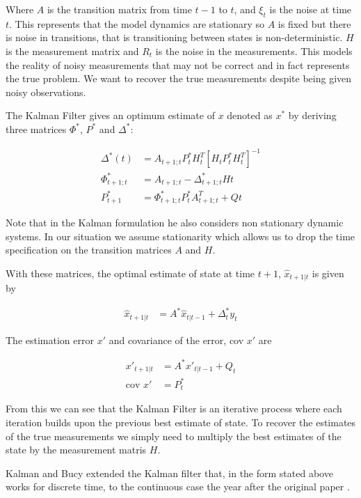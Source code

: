 \documentclass[]{../resources/final_report}
\begin{document}
Where $A$ is the transition matrix from time $t-1$ to $t$, and $\xi_t$ is the noise at time $t$. This represents that the model dynamics are stationary so $A$ is fixed but there is noise in transitions, that is transitioning between states is non-deterministic. $H$ is the measurement matrix and $R_t$ is the noise in the measurements. This models the reality of noisy measurements that may not be correct and in fact represents the true problem. We want to recover the true measurements despite being given noisy observations.
 
The Kalman Filter gives an optimum estimate of $x$ denoted as $x^*$ by deriving three matrices 
$\Phi^*$, $P^*$ and $\Delta^*$:

\begin{align}
  \Delta^*(t) &= A_{t+1;t}P^*_tH^T_t[H_tP^*_tH^T_t]^{-1} \\
  \Phi^*_{t+1;t} &= A_{t+1;t} - \Delta^*_{t+1;t}H{t} \\
  P^*_{t+1} &= \Phi^*_{t+1;t}P^*_tA^T_{t+1;t} + Q{t}
\end{align}

\pagebreak
Note that in the Kalman formulation he also considers non stationary dynamic systems. In our situation we assume stationarity which allows us to drop the time specification on the transition matrices $A$ and $H$.

With these matrices, the optimal estimate of state at time $t+1$, $\hat{x}_{t+1|t}$ is given by 

\begin{align}
  \hat{x}_{t+1|t} &= A^*\hat{x}_{t|t-1} + \Delta^*_ty_t
\end{align}

The estimation error $x'$ and covariance of the error, cov $x'$ are

\begin{align}
  x'_{t+1|t} &= A^*x'_{t|t-1} + Q_t \\
  \text{cov } x' &= P^*_t
\end{align}

From this we can see that the Kalman Filter is an iterative process where each iteration builds upon the previous best estimate of state. To recover the estimates of the true measurements we simply need to multiply the best estimates of the state by the measurement matris $H$.

Kalman and Bucy extended the Kalman filter that, in the form stated above works for discrete time, to the continuous case the year after the original paper \cite{Klmn1961NewRI}.
\end{document}
